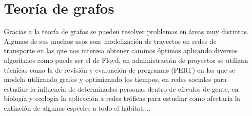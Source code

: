 	
\newpage

\section{Teoría de grafos}

Gracias a la teoría de grafos se pueden resolver problemas en áreas muy distintas.  Algunos de sus muchos usos son: modelización de trayectos en redes de transporte en las que nos interesa obtener caminos óptimos aplicando diversos algoritmos como puede ser el de Floyd, en administración de proyectos se utilizan técnicas como la de revisión y evaluación de programas (PERT) en las que se modela utilizando grafos y optimizando los tiempos, en redes sociales para estudiar la influencia de determinadas personas dentro de círculos de gente, en biología y ecología la aplicación a redes tróficas para estudiar como afectaría la extinción de algunas especies a todo el hábitat,...\\

